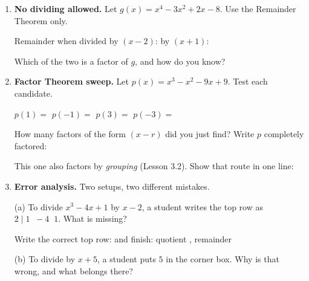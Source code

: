 \documentclass[10pt]{article}
\begin{document}
\begin{tcolorbox}[colback=white, colframe=black!40, title=\textbf{Tier A --- Approaching Proficiency},
    fonttitle=\bfseries, arc=1.5mm, left=3mm, right=3mm, top=2mm, bottom=2mm, breakable]
\begin{enumerate}[leftmargin=1.7em, itemsep=10pt]
    \vspace{2pt}
    Factor the quotient, then write the complete factorization: \blank{5.4cm}

    \vspace{2pt}
    The three zeros are \blank{3.6cm} \; --- one of them is \emph{not} an integer. Which?
    \blank{1.4cm}

  \item \textbf{No dividing allowed.} Let $g(x) = x^4 - 3x^2 + 2x - 8$. Use the Remainder Theorem
    only.

    \vspace{2pt}
    Remainder when divided by $(x-2)$: \blank{1.6cm} \qquad by $(x+1)$: \blank{1.6cm}

    \vspace{2pt}
    Which of the two is a factor of $g$, and how do you know? \blank{6.0cm}

  \item \textbf{Factor Theorem sweep.} Let $p(x) = x^3 - x^2 - 9x + 9$. Test each candidate.

    \vspace{2pt}
    $p(1) = $ \blank{1.2cm} \quad $p(-1) = $ \blank{1.2cm} \quad $p(3) = $ \blank{1.2cm} \quad
    $p(-3) = $ \blank{1.2cm}

    \vspace{2pt}
    How many factors of the form $(x-r)$ did you just find? \blank{1.2cm} \;
    Write $p$ completely factored: \blank{4.6cm}

    \vspace{2pt}
    This one also factors by \emph{grouping} (Lesson 3.2). Show that route in one line:
    \blank{6.0cm}

  \item \textbf{Error analysis.} Two setups, two different mistakes.

    \vspace{2pt}
    (a) To divide $x^3 - 4x + 1$ by $x - 2$, a student writes the top row as \; $2 \mid 1 \;\; -4
    \;\; 1$. \; What is missing? \blank{4.0cm}

    \vspace{2pt}
    Write the correct top row: \blank{4.6cm} \; and finish: quotient \blank{2.4cm}, remainder
    \blank{1.2cm}

    \vspace{2pt}
    (b) To divide by $x + 5$, a student puts $5$ in the corner box. Why is that wrong, and what
    belongs there? \blank{5.4cm}
\end{enumerate}
\end{tcolorbox}
\end{document}

